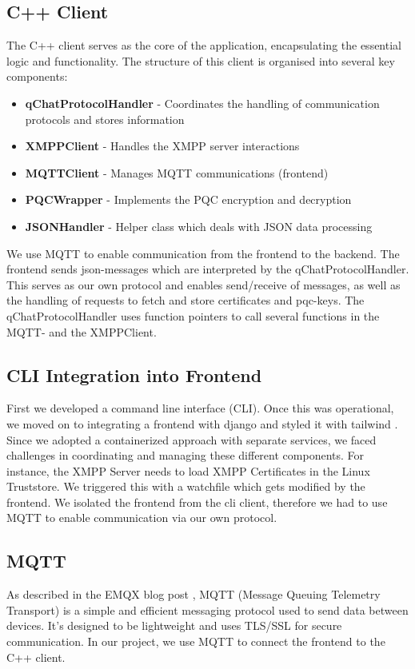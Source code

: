 \subsection{C++ Client}
\label{sec:c++client}
The C++ client serves as the core of the application, encapsulating the essential logic and functionality. The structure of this client is organised into several key components:

\begin{itemize}
	\item \textbf{qChatProtocolHandler} - Coordinates the handling of communication protocols and stores information
	\item \textbf{XMPPClient} - Handles the XMPP server interactions
	\item \textbf{MQTTClient} - Manages MQTT communications (frontend)
	\item \textbf{PQCWrapper} - Implements the PQC encryption and decryption
	\item \textbf{JSONHandler} - Helper class which deals with JSON data processing
\end{itemize}

We use MQTT to enable communication from the frontend to the backend. The frontend sends json-messages which are interpreted by the qChatProtocolHandler. This serves as our own protocol and enables send/receive of messages, as well as the handling of requests to fetch and store certificates and pqc-keys. The qChatProtocolHandler uses function pointers to call several functions in the MQTT- and the XMPPClient.

\subsection{CLI Integration into Frontend}
First we developed a command line interface (CLI). Once this was operational, we moved on to integrating a frontend with django \cite{djangowebsite2023} and styled it with tailwind \cite{tailwindcss2023}.
Since we adopted a containerized approach with separate services, we faced challenges in coordinating and managing these different components. For instance, the XMPP Server needs to load XMPP Certificates in the Linux Truststore. We triggered this with a watchfile which gets modified by the frontend. We isolated the frontend from the cli client, therefore we had to use MQTT to enable communication via our own protocol.


\subsection{MQTT}
As described in the EMQX blog post \cite{emqx2023mqttguide}, MQTT (Message Queuing Telemetry Transport) is a simple and efficient messaging protocol used to send data between devices. It's designed to be lightweight and uses TLS/SSL for secure communication. In our project, we use MQTT to connect the frontend to the C++ client.\\

